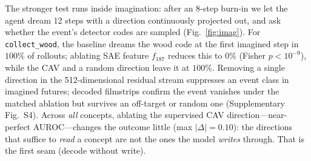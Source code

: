 \documentclass[pdflatex,sn-mathphys-num]{sn-jnl}%
\theoremstyle{thmstyleone}%
\theoremstyle{thmstyletwo}%
\theoremstyle{thmstylethree}%
\newcommand{\achname}[1]{\texttt{#1}}
\begin{document}
The stronger test runs inside imagination: after an 8-step burn-in we let the agent dream 12 steps with a direction continuously projected out, and ask whether the event's detector codes are sampled (Fig.~\ref{fig:imag}). For \achname{collect\_wood}, the baseline dreams the wood code at the first imagined step in $100\%$ of rollouts; ablating SAE feature $f_{187}$ reduces this to $0\%$ (Fisher $p<10^{-9}$), while the CAV and a random direction leave it at $100\%$. Removing a single direction in the 512-dimensional residual stream suppresses an event class in imagined futures; decoded filmstrips confirm the event vanishes under the matched ablation but survives an off-target or random one (Supplementary Fig.~S4). Across \emph{all} concepts, ablating the supervised CAV direction---near-perfect AUROC---changes the outcome little (max $|\Delta|{=}0.10$): the directions that suffice to \emph{read} a concept are not the ones the model \emph{writes} through. That is the first seam (decode without write).
\end{document}
